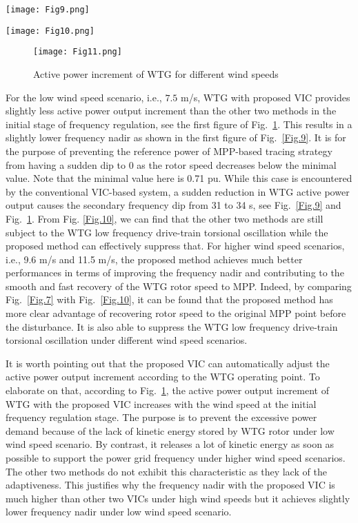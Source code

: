 \documentclass[journal]{IEEEtran}
\begin{document}
\begin{figure*}
  \centering
  \texttt{[image: Fig9.png]}
  \caption{Frequency responses for different wind speeds}
  \label{Fig.9}
\end{figure*}

\begin{figure*}
  \centering
  \texttt{[image: Fig10.png]}
  \caption{Rotor speed responses for different wind speeds}
  \label{Fig.10}
\end{figure*}

\begin{figure}
  \centering
  \texttt{[image: Fig11.png]}
  \caption{Active power increment of WTG for different wind speeds}
  \label{Fig.11}
\end{figure}

For the low wind speed scenario, i.e., $7.5$ m/s, WTG with proposed VIC provides slightly less active power output increment than the other two methods in the initial stage of frequency regulation, see the first figure of Fig.~\ref{Fig.11}. This results in a slightly lower frequency nadir as shown in the first figure of Fig.~\ref{Fig.9}. It is for the purpose of preventing the
reference power of MPP-based tracing strategy from having a sudden dip to 0 as the rotor speed decreases below the minimal value. Note that the minimal value here is 0.71 pu.  While this case is encountered by the conventional VIC-based system, a sudden reduction in WTG active power output causes the secondary frequency dip from 31 to 34 s, see Fig.~\ref{Fig.9} and Fig.~\ref{Fig.11}. From Fig. \ref{Fig.10}, we can find that the other two methods are still subject to the WTG low frequency drive-train torsional oscillation while the proposed method can effectively suppress that. For higher wind speed scenarios, i.e., 9.6 m/s and 11.5 m/s, the proposed method achieves much better performances in terms of improving the frequency nadir and contributing to the smooth and fast recovery of the WTG rotor speed to MPP. Indeed, by comparing Fig.~\ref{Fig.7} with Fig.~\ref{Fig.10}, it can be found that the proposed method has more clear advantage of recovering rotor speed
to the original MPP point before the disturbance. It is also able to suppress the WTG low frequency drive-train torsional oscillation under different wind speed scenarios.

It is worth pointing out that the proposed VIC can automatically adjust the active power output increment according to the WTG operating point.  To elaborate on that, according to Fig.~\ref{Fig.11}, the active power output increment of WTG with the proposed VIC increases with the wind speed at the initial frequency regulation stage. The purpose is to prevent the excessive power demand because of the lack of kinetic energy stored by WTG rotor under low wind speed scenario. By contrast, it releases a lot of kinetic energy as soon as possible to support the power grid frequency under higher wind speed scenarios. The other two methods do not exhibit this characteristic as they lack of the adaptiveness.  This justifies why the frequency nadir with the proposed VIC is much higher than other two VICs under high wind speeds but it achieves slightly lower frequency nadir under low wind speed scenario.
\end{document}
